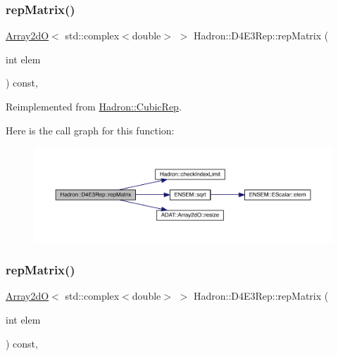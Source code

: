 \subsubsection{\texorpdfstring{repMatrix()}{repMatrix()}\hspace{0.1cm}{\footnotesize\ttfamily [1/3]}}
{\footnotesize\ttfamily \mbox{\hyperlink{classADAT_1_1Array2dO}{Array2dO}}$<$ std\+::complex$<$double$>$ $>$ Hadron\+::\+D4\+E3\+Rep\+::rep\+Matrix (\begin{DoxyParamCaption}\item[{int}]{elem }\end{DoxyParamCaption}) const\hspace{0.3cm}{\ttfamily [inline]}, {\ttfamily [virtual]}}



Reimplemented from \mbox{\hyperlink{structHadron_1_1CubicRep_ac5d7e9e6f4ab1158b5fce3e4ad9e8005}{Hadron\+::\+Cubic\+Rep}}.

Here is the call graph for this function\+:
\nopagebreak
\begin{figure}[H]
\begin{center}
\leavevmode
\includegraphics[width=350pt]{dc/d81/structHadron_1_1D4E3Rep_a313affd6d58648cb82e7095ada7afa8d_cgraph}
\end{center}
\end{figure}
\mbox{\label{structHadron_1_1D4E3Rep_a313affd6d58648cb82e7095ada7afa8d}} 
\subsubsection{\texorpdfstring{repMatrix()}{repMatrix()}\hspace{0.1cm}{\footnotesize\ttfamily [2/3]}}
{\footnotesize\ttfamily \mbox{\hyperlink{classADAT_1_1Array2dO}{Array2dO}}$<$ std\+::complex$<$double$>$ $>$ Hadron\+::\+D4\+E3\+Rep\+::rep\+Matrix (\begin{DoxyParamCaption}\item[{int}]{elem }\end{DoxyParamCaption}) const\hspace{0.3cm}{\ttfamily [inline]}, {\ttfamily [virtual]}}



